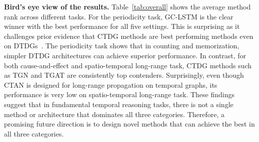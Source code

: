 \textbf{Bird's eye view of the results.} Table~\ref{tab:overall} shows the average method rank across different tasks. 
For the periodicity task, GC-LSTM is the clear winner with the best performance for all five settings. This is surprising as it challenges prior evidence that CTDG methods are best performing methods even on DTDGs~\cite{huangutg}. The periodicity task shows that in counting and memorization, simpler DTDG architectures can achieve superior performance. 
In contrast, for both cause-and-effect and spatio-temporal long-range task, CTDG methods such as TGN and TGAT are consistently top contenders. Surprisingly, even though CTAN is designed for long-range propagation on temporal graphs, its performance is very low on spatio-temporal long-range task. These findings suggest that in fundamental temporal reasoning tasks, there is not a single method or architecture that dominates all three categories. Therefore, a promising future direction is to design novel methods that can achieve the best in all three categories. 


